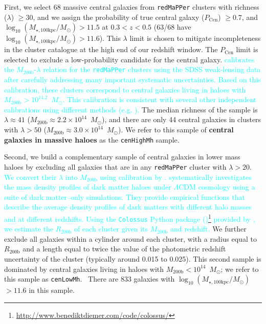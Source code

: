 \documentclass[a4paper,fleqn,usenatbib]{mnras}
\def\msun{$M_\odot$}
\def\redm{\texttt{redMaPPer}}
\def\rbcg{\texttt{cenHighMh}}
\def\nbcg{\texttt{cenLowMh}}
\def\mstar{{$M_{\star}$}}
\def\mhalo{{$M_{\mathrm{200b}}$}}
\def\logmtot{{$\log_{10} (M_{\star,100\mathrm{kpc}}/M_{\odot})$}}
\newcommand{\song}[1]{\textcolor{cyan}{#1}}
\begin{document}
 
    First, we select 68 massive central galaxies from \redm{} clusters 
    with richness ($\lambda$) $\geq 30$, and we assign the probability of true central 
    galaxy ($P_{\mathrm{Cen}}$) $\geq 0.7$, and \logmtot{}$ >11.5$ 
    at $0.3 < z < 0.5$ (63/68 have \logmtot{}$ >11.6$). 
    This $\lambda$ limit is chosen to mitigate incompleteness in the cluster catalogue
    at the high end of our redshift window. 
    The $P_{\mathrm{Cen}}$ limit is selected to exclude a low-probability candidate for 
    the central galaxy. 
    \song{
    \citet{Simet2017} calibrates the \mhalo{}-$\lambda$ relation for the \redm{} 
    clusters using the SDSS weak-lensing data after carefully addressing many 
    important systematic uncertainties.
    Based on this calibration, these clusters correspond to central galaxies living 
    in haloes with \mhalo{}$>10^{14.2}$~\msun{}. 
    This calibration is consistent with several other independent calibrations 
    using different methods (e.g. \citealt{Saro2015, Farahi2016, 
    Melchior2016, Murata2017}). 
    }
    The median richness of the sample is $\lambda \approx 41$ 
    (\mhalo{}$\approx 2.2 \times 10^{14}$~\msun{}), and there are 
    only 44 central galaxies in clusters with $\lambda>50$ 
    (\mhalo{}$\approx 3.0 \times 10^{14}$~\msun{}).
    We refer to this sample of \textbf{central galaxies in massive haloes} as 
    the \rbcg{} sample.
    
    Second, we build a complementary sample of central galaxies in lower mass haloes
    by excluding all galaxies that are in any \redm{} cluster with $\lambda > 20$.
    \song{
    We convert their $\lambda$ into $M_{\mathrm{200b}}$ using calibration by 
    \citet{Simet2017}. 
    \citet{Diemer2015} systematically investigates the mass density profiles of 
    dark matter haloes under $\Lambda$CDM cosmology using a suite of dark matter--only
    simulations.  
    They provide empirical functions that describe the average density profiles 
    of dark matters with different halo masses and at different redshifts.  
    Using the \texttt{Colossus} Python package 
    (\citealt{Colossus})\footnote{\url{http://www.benediktdiemer.com/code/colossus/}}
    provided by \citet{Diemer2015}, we estimate the $R_{\mathrm{200b}}$ of each 
    cluster given its $M_{\mathrm{200b}}$ and redshift.
    } 
    We further exclude all galaxies within a cylinder around each cluster, with a radius
    equal to $R_{\mathrm{200b}}$ and a length equal to twice the value of the 
    photometric redshift uncertainty of the cluster (typically around 0.015 to 0.025).
    This second sample is dominated by central galaxies living in haloes with
    $M_{\mathrm{200b}} < 10^{14}$~\msun{}; we refer to this sample as \nbcg{}. \
    There are 833 galaxies with \logmtot{}$> 11.6$ in this sample.
\end{document}

